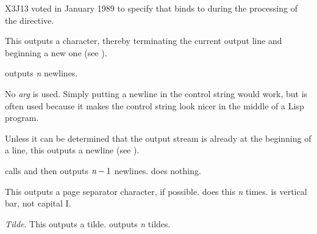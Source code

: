 \begin{flushdesc}
\begin{new}
X3J13 voted in January 1989
to specify that  binds  to 
during the processing of the \cd{{\Xtilde}\$} directive.
\end{new}


\item[\cd{{\Xtilde}\%}]
This outputs a  character, thereby terminating the current
output line and beginning a new one
(see ).

 outputs \emph{n} newlines.

No \emph{arg} is used.  Simply putting a newline in the control string
would work, but \cd{{\Xtilde}\%} is often used because it makes the control string
look nicer in the middle of a Lisp program.

\item[\cd{{\Xtilde}\&}]
Unless it can be determined that the output stream
is already at the beginning of a line,
this outputs a newline (see ).

 calls 
and then outputs $\emph{n}-1$ newlines.
 does nothing.

\item[\cd{{\Xtilde}|}]
This outputs a page separator character, if possible.
 does this
\emph{n} times.  \cd{|} is vertical bar, not capital I.

\item[\cd{{\Xtilde}{\Xtilde}}]
\emph{Tilde}.
This outputs a tilde.   outputs \emph{n} tildes.


\end{flushdesc}
